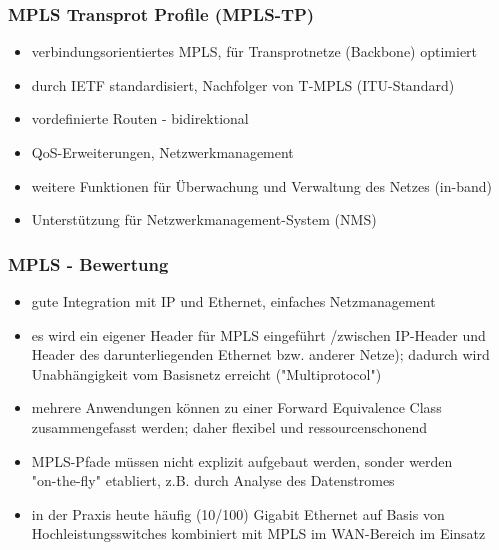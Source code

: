 \subsubsection{MPLS Transprot Profile (MPLS-TP)}
\begin{itemize}
	\item verbindungsorientiertes MPLS, für Transprotnetze (Backbone) optimiert
	\item durch IETF standardisiert, Nachfolger von T-MPLS (ITU-Standard)
	\item vordefinierte Routen - bidirektional
	\item QoS-Erweiterungen, Netzwerkmanagement
	\item weitere Funktionen für Überwachung und Verwaltung des Netzes (in-band)
	\item Unterstützung für Netzwerkmanagement-System (NMS)
\end{itemize}
\subsubsection{MPLS - Bewertung}
\begin{itemize}
	\item gute Integration mit IP und Ethernet, einfaches Netzmanagement
	\item es wird ein eigener Header für MPLS eingeführt /zwischen IP-Header und Header des darunterliegenden Ethernet bzw. anderer Netze);
	dadurch wird Unabhängigkeit vom Basisnetz erreicht ("Multiprotocol")
	\item mehrere Anwendungen können zu einer Forward Equivalence Class zusammengefasst werden; daher flexibel und ressourcenschonend
	\item MPLS-Pfade müssen nicht explizit aufgebaut werden, sonder werden \\"on-the-fly" etabliert, z.B. durch Analyse des Datenstromes
	\item in der Praxis heute häufig (10/100) Gigabit Ethernet auf Basis von Hochleistungsswitches kombiniert mit MPLS im WAN-Bereich im Einsatz
\end{itemize}
